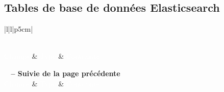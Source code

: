 \subsection{Tables de base de données Elasticsearch}
\begin{longtable}{|l|l|p{5cm}|}
	\caption{Table Produit} \label{tab:produit_table}                                                                   \\
	\hline
	 \textcolor{white}{Champs} & \textcolor{white}{Type} & \textcolor{white}{Contrainte}              \\
	\hline
	\endfirsthead

	\multicolumn{3}{c}%
	{{\bfseries \tablename\ \thetable{} -- Suivie de la page précédente}}                                               \\
	\hline
	 \textcolor{white}{Champs} & \textcolor{white}{Type} & \textcolor{white}{Contrainte}              \\
	\hline
	\endhead



\end{longtable}
